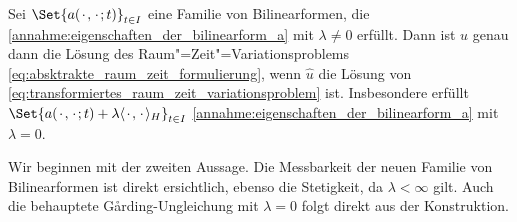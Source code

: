 \begin{Lemma}
\label{lemma:transformation_zu_elliptischem_operator}
    Sei $\Set{a(\blank, \blank; t)}_{t \in I}$ eine Familie von Bilinearformen, die \cref{annahme:eigenschaften_der_bilinearform_a} mit $\lambda \neq 0$ erfüllt.
    Dann ist $u$ genau dann die Lösung des Raum"=Zeit"=Variationsproblems \cref{eq:absktrakte_raum_zeit_formulierung}, wenn $\hat{u}$ die Lösung von  \cref{eq:transformiertes_raum_zeit_variationsproblem} ist.
    Insbesondere erfüllt $\Set{a(\blank, \blank; t) + \lambda \skp{\blank}{\blank}{H}}_{t \in I}$ \cref{annahme:eigenschaften_der_bilinearform_a} mit $\lambda = 0$.

    \begin{Beweis}
        Wir beginnen mit der zweiten Aussage.
        Die Messbarkeit der neuen Familie von Bilinearformen ist direkt ersichtlich, ebenso die Stetigkeit, da $\lambda < \infty$ gilt.
        Auch die behauptete G\aa{}rding-Ungleichung mit $\lambda = 0$ folgt direkt aus der Konstruktion.


\end{Beweis}
\end{Lemma}
